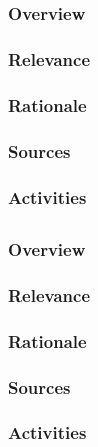 \documentclass[12pt]{amsart}
\begin{document}
\subsection{}
\subsubsection{Overview}
\subsubsection{Relevance}
\subsubsection{Rationale}
\subsubsection{Sources}
\subsubsection{Activities}



\subsection{}
\subsubsection{Overview}
\subsubsection{Relevance}
\subsubsection{Rationale}
\subsubsection{Sources}
\subsubsection{Activities}
\end{document}

